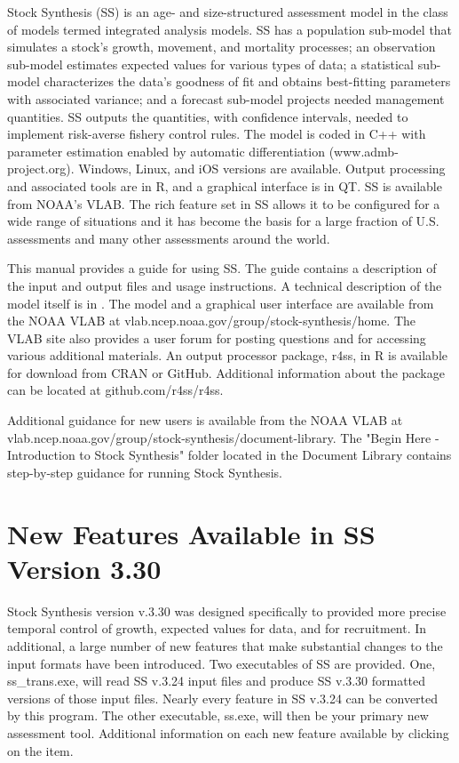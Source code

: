 Stock Synthesis (SS) is an age- and size-structured assessment model in the class of models termed integrated analysis models. SS has a population sub-model that simulates a stock's growth, movement, and mortality processes; an observation sub-model estimates expected values for various types of data; a statistical sub-model characterizes the data’s goodness of fit and obtains best-fitting parameters with associated variance; and a forecast sub-model projects needed management quantities.  SS outputs the quantities, with confidence intervals, needed to implement risk-averse fishery control rules. The model is coded in C++ with parameter estimation enabled by automatic differentiation (www.admb-project.org).  Windows, Linux, and iOS versions are available.  Output processing and associated tools are in R, and a graphical interface is in QT.  SS is available from NOAA’s VLAB. The rich feature set in SS allows it to be configured for a wide range of situations and it has become the basis for a large fraction of U.S. assessments and many other assessments around the world.  

This manual provides a guide for using SS. The guide contains a description of the input and output files and usage instructions. A technical description of the model itself is in \citet{methot_stock_2013}. The model and a graphical user interface are available from the NOAA VLAB at vlab.ncep.noaa.gov/group/stock-synthesis/home. The VLAB site also provides a user forum for posting questions and for accessing various additional materials.  An output processor package, r4ss, in R is available for download from CRAN or GitHub. Additional information about the package can be located at github.com/r4ss/r4ss.

Additional guidance for new users is available from the NOAA VLAB at vlab.ncep.noaa.gov/group/stock-synthesis/document-library.  The "Begin Here - Introduction to Stock Synthesis" folder located in the Document Library contains step-by-step guidance for running Stock Synthesis.  

	
\section{New Features Available in SS Version 3.30}
Stock Synthesis version v.3.30 was designed specifically to provided more precise temporal control of growth, expected values for data, and for recruitment.  In additional, a large number of new features that make substantial changes to the input formats have been introduced.  Two executables of SS are provided.  One, ss\_trans.exe, will read SS v.3.24 input files and produce SS v.3.30 formatted versions of those input files.  Nearly every feature in SS v.3.24 can be converted by this program.  The other executable, ss.exe, will then be your primary new assessment tool. Additional information on each new feature available by clicking on the item.
		
